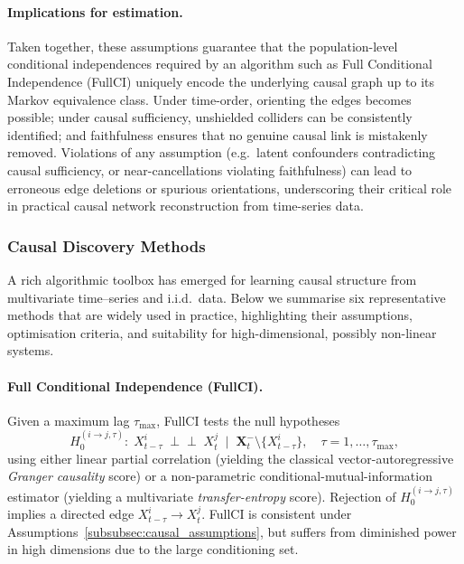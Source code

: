 \documentclass[14pt]{extarticle}
\begin{document}
	\paragraph*{Implications for estimation.}
	Taken together, these assumptions guarantee that the population-level conditional independences required by an algorithm such as Full Conditional Independence (FullCI) uniquely encode the underlying causal graph up to its Markov equivalence class.  Under time-order, orienting the edges becomes possible; under causal sufficiency, unshielded colliders can be consistently identified; and faithfulness ensures that no genuine causal link is mistakenly removed.  Violations of any assumption (e.g.\ latent confounders contradicting causal sufficiency, or near-cancellations violating faithfulness) can lead to erroneous edge deletions or spurious orientations, underscoring their critical role in practical causal network reconstruction from time-series data.
	
	\subsubsection{Causal Discovery Methods}
	
	A rich algorithmic toolbox has emerged for learning causal structure from multivariate time–series and i.i.d.\ data.  Below we summarise six representative methods that are widely used in practice, highlighting their assumptions, optimisation criteria, and suitability for high-dimensional, possibly non-linear systems.
	
	
	\paragraph*{Full Conditional Independence (FullCI).}  
	Given a maximum lag $\tau_{\max}$, FullCI tests the null hypotheses  
	$$
	H_0^{(i\to j,\tau)}:\;X^{i}_{t-\tau}\;\perp\!\!\!\perp\;X^{j}_{t}\;\mid\;\mathbf X^{-}_{t}\setminus\{X^{i}_{t-\tau}\},\quad
	\tau=1,\dots,\tau_{\max},
	$$
	using either linear partial correlation (yielding the classical vector-autoregressive \emph{Granger causality} score) or a non-parametric conditional-mutual-information estimator (yielding a multivariate \emph{transfer-entropy} score).  Rejection of $H_0^{(i\to j,\tau)}$ implies a directed edge $X^{i}_{t-\tau}\!\to\!X^{j}_{t}$.  FullCI is consistent under Assumptions~\ref{subsubsec:causal_assumptions}, but suffers from diminished power in high dimensions due to the large conditioning set.  
	
	
\end{document}
